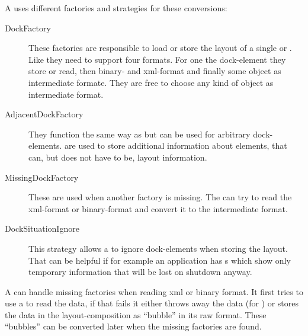 
A  uses different factories and strategies for these conversions:
\begin{description}
 \item[DockFactory] These factories are responsible to load or store the layout of a single  or . Like  they need to support four formats. For one the dock-element they store or read, then binary- and xml-format and finally some object as intermediate formate. They are free to choose any kind of object as intermediate format.
 \item[AdjacentDockFactory] They function the same way as  but can be used for arbitrary dock-elements.  are used to store additional information about elements, that can, but does not have to be, layout information.
 \item[MissingDockFactory] These are used when another factory is missing. The  can try to read the xml-format or binary-format and convert it to the intermediate format.
 \item[DockSituationIgnore] This strategy allows a  to ignore dock-elements when storing the layout. That can be helpful if for example an application has s which show only temporary information that will be lost on shutdown anyway.
 \end{description}

A  can handle missing factories when reading xml or binary format. It first tries to use a  to read the data, if that fails it either throws away the data (for ) or stores the data in the layout-composition as ``bubble'' in its raw format. These ``bubbles'' can be converted later when the missing factories are found.


